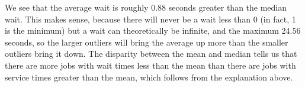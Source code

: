 \documentclass[11pt]{article} %
\begin{document}
\begin{enumerate}
\begin{enumerate}
 We see that the average wait is roughly 0.88 seconds greater than the median wait.  This makes sense, because there will never be a wait less than 0 (in fact, 1 is the minimum) but a wait can theoretically be infinite, and the maximum 24.56 seconds, so the larger outliers will bring the average up more than the smaller outliers bring it down.  The disparity between the mean and median tells us that there are more jobs with wait times less than the mean than there are jobs with service times greater than the mean, which follows from the explanation above.

\end{enumerate}

\end{enumerate}
\end{document}
